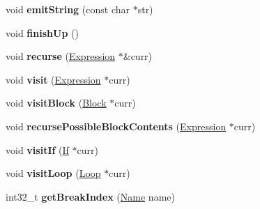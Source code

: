\begin{DoxyCompactItemize}
void {\bfseries emit\+String} (const char $\ast$str)
\item 
\mbox{\label{classwasm_1_1_wasm_binary_writer_a93e3166985222419ac1550a9f5fa3124}} 
void {\bfseries finish\+Up} ()
\item 
\mbox{\label{classwasm_1_1_wasm_binary_writer_a57f59fc91e821447f9e58ce302e96d7e}} 
void {\bfseries recurse} (\mbox{\hyperlink{classwasm_1_1_expression}{Expression}} $\ast$\&curr)
\item 
\mbox{\label{classwasm_1_1_wasm_binary_writer_a98d0046c09e1441d1048a2b0f7f33e3a}} 
void {\bfseries visit} (\mbox{\hyperlink{classwasm_1_1_expression}{Expression}} $\ast$curr)
\item 
\mbox{\label{classwasm_1_1_wasm_binary_writer_a95d62a3143aa456662a7011c3e7e6d6b}} 
void {\bfseries visit\+Block} (\mbox{\hyperlink{classwasm_1_1_block}{Block}} $\ast$curr)
\item 
\mbox{\label{classwasm_1_1_wasm_binary_writer_aaceba5b737a5c8cd6221288620c8abf5}} 
void {\bfseries recurse\+Possible\+Block\+Contents} (\mbox{\hyperlink{classwasm_1_1_expression}{Expression}} $\ast$curr)
\item 
\mbox{\label{classwasm_1_1_wasm_binary_writer_a81494408137a81928335f15e9942ec81}} 
void {\bfseries visit\+If} (\mbox{\hyperlink{classwasm_1_1_if}{If}} $\ast$curr)
\item 
\mbox{\label{classwasm_1_1_wasm_binary_writer_a36363f12983bd04fbded64629e5d5fd1}} 
void {\bfseries visit\+Loop} (\mbox{\hyperlink{classwasm_1_1_loop}{Loop}} $\ast$curr)
\item 
\mbox{\label{classwasm_1_1_wasm_binary_writer_aeec78b2abce723c6545399be65f4d29d}} 
int32\+\_\+t {\bfseries get\+Break\+Index} (\mbox{\hyperlink{structwasm_1_1_name}{Name}} name)
\item 
\mbox{\label{classwasm_1_1_wasm_binary_writer_afb7d323157438b2900eb1fcaea66b417}} 

\end{DoxyCompactItemize}
